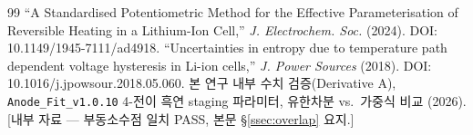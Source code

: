 \documentclass[11pt,a4paper]{article}
\begin{document}
\begin{thebibliography}{99}
 ``A Standardised Potentiometric Method for the Effective Parameterisation of Reversible Heating in a Lithium-Ion Cell,'' \emph{J. Electrochem. Soc.} (2024). DOI: 10.1149/1945-7111/ad4918.
 ``Uncertainties in entropy due to temperature path dependent voltage hysteresis in Li-ion cells,'' \emph{J. Power Sources} (2018). DOI: 10.1016/j.jpowsour.2018.05.060.
 본 연구 내부 수치 검증(Derivative A), \texttt{Anode\_Fit\_v1.0.10} 4-전이 흑연 staging 파라미터, 유한차분 vs.\ 가중식 비교 (2026). [내부 자료 — 부동소수점 일치 PASS, 본문 \S\ref{ssec:overlap} 요지.]
\end{thebibliography}
\end{document}
